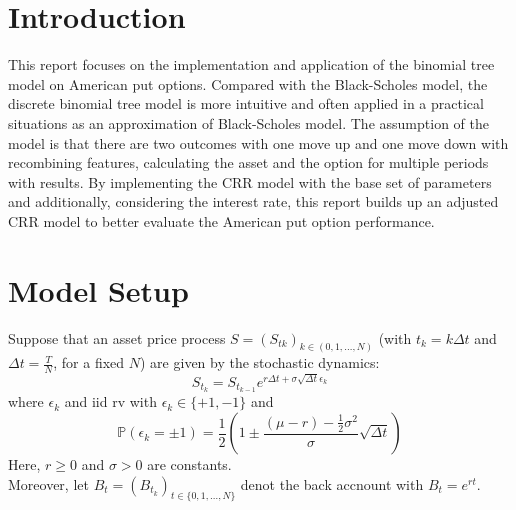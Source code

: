 \documentclass[12pt]{article}
\begin{document}
\section{Introduction}
This report focuses on the implementation and application of the binomial tree model on American put options. Compared with the Black-Scholes model, the discrete binomial tree model is more intuitive 
and often applied in a practical situations as an approximation of Black-Scholes model. The assumption of the model is that there are two outcomes with one move up and one move down with recombining features, calculating 
the asset and the option for multiple periods with results. By implementing the CRR model with the base set of parameters and additionally, considering the interest rate, this report builds up an adjusted 
CRR model to better evaluate the American put option performance.


\section{Model Setup}
Suppose that an asset price process $S = (S_{tk})_{k\in (0,1,\ldots,N)}$ (with $t_k = k\Delta t$ and $\Delta t = \frac{T}{N}$, for a fixed $N$) are given by the stochastic dynamics:
\[S_{t_k} = S_{t_{k-1}}e^{r\Delta t + \sigma \sqrt{\Delta t} \epsilon_k}\]
where $\epsilon_k$ and iid rv with $\epsilon_k \in \{+1, -1\}$ and
\[ \mathbb{P} (\epsilon_k = \pm 1) = \frac{1}{2}(1 \pm \frac{(\mu - r) - \frac{1}{2}\sigma^2}{\sigma}\sqrt{\Delta t}) \]
Here, $r\ge 0$ and $\sigma > 0$ are constants.
\\
Moreover, let $B_t = (B_{t_k})_{t\in \{ 0,1,\ldots, N \}}$ denot the back accnount with $B_t = e^{rt}$.
\end{document}
